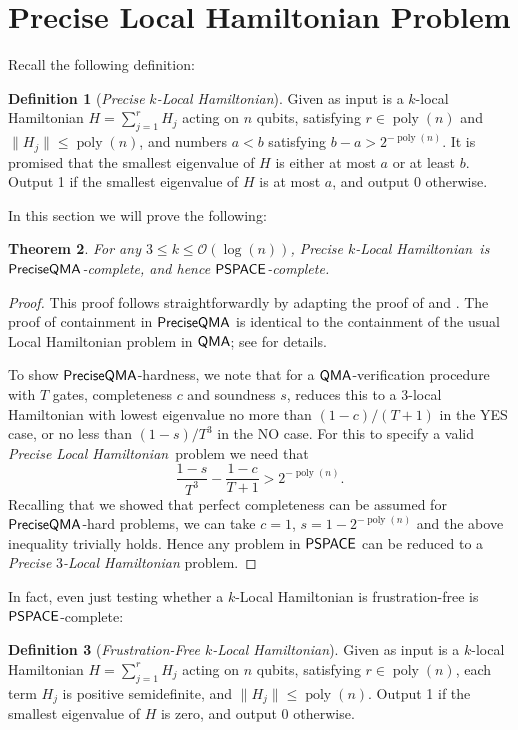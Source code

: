 \documentclass[11pt]{article}
\newtheorem{theorem}{Theorem}
\theoremstyle{definition}
\newtheorem{definition}[theorem]{Definition}
\theoremstyle{remark}
\newcommand\QMA{{\sf{QMA}}}
\newcommand\PSPACE{{\sf{PSPACE}}}
\newcommand\QMAexp{{\sf{PreciseQMA}}}
\newcommand\preciselh{\textit{Precise Local Hamiltonian}}
\newcommand\preciseklh{\textit{Precise }$k$\textit{-Local Hamiltonian}}
\newcommand\preciseilh[1]{\textit{Precise }\ensuremath{#1}\textit{-Local Hamiltonian}}
\DeclareMathOperator{\poly}{poly}
\begin{document}
\section{Precise Local Hamiltonian Problem}\label{app:localhamiltonian}
Recall the following definition:
\begingroup
\def\thedefinition{\ref{def: precise local hamiltonian}}
\begin{definition}[\preciseklh]
Given as input is a $k$-local Hamiltonian $H=\sum_{j=1}^rH_j$ acting on $n$ qubits, satisfying $r \in \poly(n)$ and $\|H_j\| \le \poly(n)$, and numbers $a < b$ satisfying $b - a > 2^{-\poly(n)}$. It is promised that the smallest eigenvalue of $H$ is either at most $a$ or at least $b$. Output 1 if the smallest eigenvalue of $H$ is at most $a$, and output 0 otherwise.
\end{definition}
\endgroup
In this section we will prove the following:
\begingroup
\def\thetheorem{\ref{thm: precise local hamiltonian}}
\begin{theorem}
For any $3 \le k \le \mathcal{O}(\log(n))$, \preciseklh \ is $\QMAexp$-complete, and hence $\PSPACE$-complete.
\end{theorem}
\endgroup
\begin{proof}
This proof follows straightforwardly by adapting the proof of \cite{ksv02} and \cite{kr03}. The proof of containment in $\QMAexp$ is identical to the containment of the usual Local Hamiltonian problem in $\QMA$; see \cite{ksv02} for details.

To show $\QMAexp$-hardness, we note that for a $\QMA$-verification procedure with $T$ gates, completeness $c$ and soundness $s$, \cite{kr03} reduces this to a 3-local Hamiltonian with lowest eigenvalue no more than $(1-c) / (T+1)$ in the YES case, or no less than $(1-s) / T^3$ in the NO case. For this to specify a valid \preciselh \ problem we need that
\begin{equation} \label{eq:preciselh_condition}
\frac{1-s}{T^3} - \frac{1-c}{T+1} > 2^{-\poly(n)}.
\end{equation}
Recalling that we showed that perfect completeness can be assumed for $\QMAexp$-hard problems, we can take $c=1$, $s = 1-2^{-\poly(n)}$ and the above inequality trivially holds. Hence any problem in $\PSPACE$ can be reduced to a \preciseilh{3} problem.
\end{proof}
In fact, even just testing whether a $k$-Local Hamiltonian is frustration-free is $\PSPACE$-complete: \begin{definition} [\emph{Frustration-Free $k$-Local Hamiltonian}] Given as input is a $k$-local Hamiltonian $H=\sum_{j=1}^rH_j$ acting on $n$ qubits, satisfying $r \in \poly(n)$, each term $H_j$ is positive semidefinite, and $\|H_j\| \le \poly(n)$. Output 1 if the smallest eigenvalue of $H$ is zero, and output 0 otherwise.
\end{definition}
\end{document}
